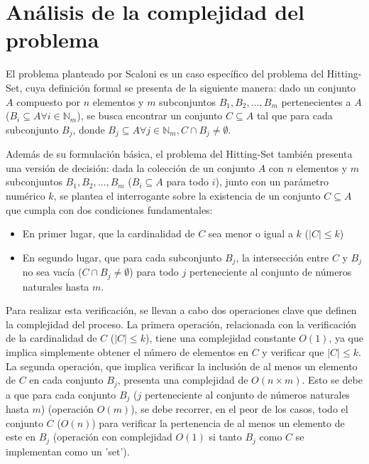 \section{Análisis de la complejidad del problema}

El problema planteado por Scaloni es un caso específico del problema del 
Hitting-Set, cuya definición formal se presenta de la siguiente manera: dado un 
conjunto $A$ compuesto por $n$ elementos y $m$ subconjuntos $B_{1}, B_{2}, \dots, B_{m}$ 
pertenecientes a $A$ ($B_{i}\subseteq A \forall i \in \mathbb{N}_{m}$), se busca encontrar un conjunto $C \subseteq A$ tal que para cada 
subconjunto $B_{j}$, donde $B_{j} \subseteq A \forall j \in \mathbb{N}_{m},  C \cap B_{j}\neq \emptyset$. 

Además de su formulación básica, el problema del Hitting-Set también presenta una versión
de decisión: dada la colección de un conjunto $A$ con $n$ elementos y $m$ subconjuntos
$B_{1}, B_{2}, \dots, B_{m}$ ($B_{i}\subseteq A$ para todo $i$), junto con un 
parámetro numérico $k$, se plantea el interrogante sobre la existencia de un conjunto 
$C \subseteq A$ que cumpla con dos condiciones fundamentales:

\begin{itemize}
    \item En primer lugar, que la cardinalidad de $C$ sea menor o igual a $k$ ($\left| C \right|\leq k$) 
    \item En segundo lugar, que para cada subconjunto $B_{j}$, la intersección entre $C$ y $B_{j}$ no sea vacía ($C \cap B_{j} \neq \emptyset$) para todo $j$ perteneciente al conjunto de  números naturales hasta $m$.
\end{itemize}

Para realizar esta verificación, se llevan a cabo dos operaciones clave que definen la 
complejidad del proceso. La primera operación, relacionada con la verificación de la 
cardinalidad de $C$ ($\left| C \right|\leq k$), tiene una complejidad constante $O(1)$, 
ya que implica simplemente obtener el número de elementos en $C$ y verificar que $\left|C\right| \leq k$.
La segunda operación, que implica verificar la inclusión de al menos un elemento de $C$ 
en cada conjunto $B_{j}$, presenta una complejidad de $O(n \times m)$. Esto se debe a 
que para cada conjunto $B_{j}$ ($j$ perteneciente al conjunto de números naturales hasta 
$m$) (operación $O(m)$), se debe recorrer, en el peor de los casos, todo el conjunto $C$ 
($O(n)$) para verificar la pertenencia de al menos un elemento de este en $B_{j}$ 
(operación con complejidad $O(1)$ si tanto $B_{j}$ como $C$ se implementan como un 'set').

